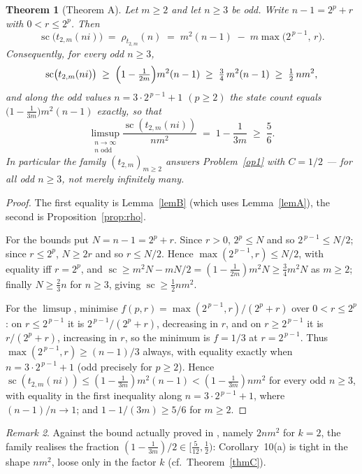 \documentclass[10pt,reqno]{amsart}
\theoremstyle{plain}
\newtheorem{theorem}{Theorem}
\theoremstyle{definition}
\theoremstyle{remark}
\newtheorem{remark}[theorem]{Remark}
\numberwithin{theorem}{section}
\DeclareMathOperator{\sco}{sc}
\newcommand{\tm}{t_{2,m}}
\begin{document}
\begin{theorem}[Theorem A]
\label{thmA}
Let $m \ge 2$ and let $n \ge 3$ be odd. Write $n - 1 = 2^p + r$ with $0 < r \le 2^p$. Then
\[
  \sco\bigl(\tm(ni)\bigr) \;=\; \rho_{\tm}(n)
  \;=\; m^2(n-1) \;-\; m\max\bigl(2^{\,p-1},\,r\bigr) .
\]
Consequently, for every odd $n \ge 3$,
\[
  \sco\bigl(\tm(ni)\bigr) \;\ge\; \Bigl(1 - \tfrac{1}{2m}\Bigr) m^2 (n-1)
  \;\ge\; \tfrac34\, m^2(n-1) \;\ge\; \tfrac12\, n m^2 ,
\]
and along the odd values $n = 3\cdot 2^{\,p-1} + 1$ $(p \ge 2)$ the state count equals
$\bigl(1 - \tfrac{1}{3m}\bigr)m^2(n-1)$ exactly, so that
\[
  \limsup_{\substack{n \to \infty \\ n \text{ odd}}}
  \frac{\sco(\tm(ni))}{n m^2} \;=\; 1 - \frac{1}{3m} \;\ge\; \frac56 .
\]
In particular the family $(\tm)_{m \ge 2}$ answers Problem~\ref{op1} with $C = 1/2$ ---
for all odd $n \ge 3$, not merely infinitely many.
\end{theorem}

\begin{proof}
The first equality is Lemma~\ref{lemB} (which uses Lemma~\ref{lemA}), the second is
Proposition~\ref{prop:rho}.

For the bounds put $N = n-1 = 2^p + r$. Since $r > 0$, $2^p \le N$ and so
$2^{\,p-1} \le N/2$; since $r \le 2^p$, $N \ge 2r$ and so $r \le N/2$. Hence
$\max(2^{\,p-1},r) \le N/2$, with equality iff $r = 2^p$, and
$\sco \ge m^2N - mN/2 = (1 - \tfrac1{2m})m^2N \ge \tfrac34 m^2N$ as $m \ge 2$; finally
$N \ge \tfrac23 n$ for $n \ge 3$, giving $\sco \ge \tfrac12 nm^2$.

For the $\limsup$, minimise $f(p,r) = \max(2^{\,p-1},r)/(2^p+r)$ over $0 < r \le 2^p$: on
$r \le 2^{\,p-1}$ it is $2^{\,p-1}/(2^p+r)$, decreasing in $r$, and on $r \ge 2^{\,p-1}$ it
is $r/(2^p+r)$, increasing in $r$, so the minimum is $f = 1/3$ at $r = 2^{\,p-1}$. Thus
$\max(2^{\,p-1},r) \ge (n-1)/3$ always, with equality exactly when
$n = 3\cdot 2^{\,p-1}+1$ (odd precisely for $p \ge 2$). Hence
$\sco(\tm(ni)) \le (1 - \tfrac1{3m})m^2(n-1) < (1-\tfrac1{3m})nm^2$ for every odd
$n \ge 3$, with equality in the first inequality along $n = 3\cdot2^{\,p-1}+1$, where
$(n-1)/n \to 1$; and $1 - 1/(3m) \ge 5/6$ for $m \ge 2$.
\end{proof}

\begin{remark}
Against the bound actually proved in \cite{MRS}, namely $2nm^2$ for $k = 2$, the family
realises the fraction $(1 - \tfrac1{3m})/2 \in [\tfrac5{12}, \tfrac12)$: Corollary~10(a) is
tight in the shape $nm^2$, loose only in the factor $k$ (cf.\ Theorem~\ref{thmC}).
\end{remark}
\end{document}

